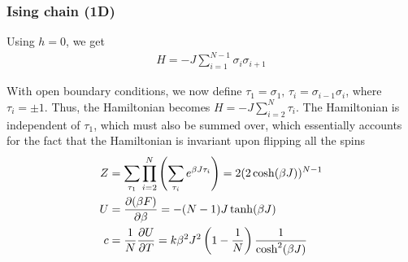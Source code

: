 \documentclass[a4paper, english, 12pt]{article}
\newcommand{\closed}[1]{\left( #1 \right)}
\begin{document}
\begin{multicols*}{2}
\subsubsection*{\scriptsize Ising chain (1D)}
Using $h=0$, we get 
\begin{align*}
    H = -J\sum_{i=1}^{N-1} \sigma_i \sigma_{i+1}
\end{align*}

With open boundary conditions, we now define $\tau_1=\sigma_1,\,\tau_i=\sigma_{i-1}\sigma_i$, where $\tau_i=\pm1$. Thus, the Hamiltonian becomes $H=-J\sum_{i=2}^N \tau_i$. The Hamiltonian is independent of $\tau_1$, which must also be summed over, which essentially accounts for the fact that the Hamiltonian is invariant upon flipping all the spins 
\begin{align*}
    Z &= \sum_{\tau_1} \prod_{i=2}^N \closed{\sum_{\tau_i} e^{\beta J \tau_i}} = 2(2\cosh(\beta J))^{N-1} \\ 
    U &= \pdv{(\beta F)}{\beta} = -(N-1)J\tanh(\beta J) \\ 
    c &= \frac{1}{N}\pdv{U}{T} = k\beta^2 J^2 \closed{1-\frac{1}{N}} \frac{1}{\cosh^2(\beta J)}
\end{align*} 



\end{multicols*}
\end{document}
